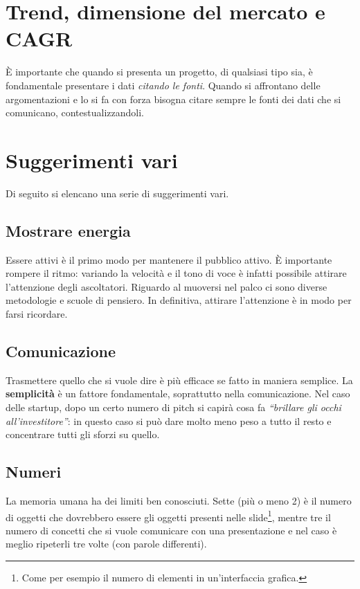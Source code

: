 \section{Trend, dimensione del mercato e CAGR}

È importante che quando si presenta un progetto, di qualsiasi tipo sia, è
fondamentale presentare i dati \textit{citando le fonti}.
Quando si affrontano delle argomentazioni e lo si fa con forza bisogna citare
sempre le fonti dei dati che si comunicano, contestualizzandoli.

\section{Suggerimenti vari}

Di seguito si elencano una serie di suggerimenti vari.

\subsection{Mostrare energia}

Essere attivi è il primo modo per mantenere il pubblico attivo. È
importante rompere il ritmo: variando la velocità e il tono di voce è
infatti possibile attirare l'attenzione degli ascoltatori. Riguardo al
muoversi nel palco ci sono diverse metodologie e scuole di pensiero. In
definitiva, attirare l'attenzione è in modo per farsi ricordare.

\subsection{Comunicazione}

Trasmettere quello che si vuole dire è più efficace se fatto in maniera
semplice. La \textbf{semplicità} è un fattore fondamentale, soprattutto nella
comunicazione. Nel caso delle startup, dopo un certo numero di pitch si capirà
cosa fa \emph{``brillare gli occhi all'investitore''}: in questo caso si può dare
molto meno peso a tutto il resto e concentrare tutti gli sforzi su quello.

\subsection{Numeri}

La memoria umana ha dei limiti ben conosciuti. Sette (più o meno 2) è il numero
di oggetti che dovrebbero essere gli oggetti presenti nelle slide\footnote{Come
per esempio il numero di elementi in un'interfaccia grafica.}, mentre tre il
numero di concetti che si vuole comunicare con una presentazione e nel caso è
meglio ripeterli tre volte (con parole differenti).

